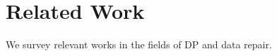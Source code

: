 \section{Related Work}\label{sec:related}
We survey relevant works in the fields of DP and data repair.


